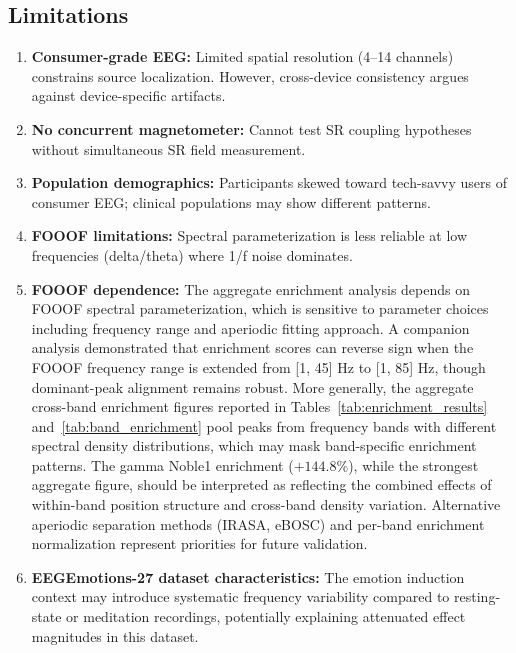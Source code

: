 \documentclass[11pt,a4paper]{article}
\begin{document}
\subsection{Limitations}

\begin{enumerate}
    \item \textbf{Consumer-grade EEG:} Limited spatial resolution (4--14 channels) constrains source localization. However, cross-device consistency argues against device-specific artifacts.

    \item \textbf{No concurrent magnetometer:} Cannot test SR coupling hypotheses without simultaneous SR field measurement.

    \item \textbf{Population demographics:} Participants skewed toward tech-savvy users of consumer EEG; clinical populations may show different patterns.

    \item \textbf{FOOOF limitations:} Spectral parameterization is less reliable at low frequencies (delta/theta) where 1/f noise dominates.

    \item \textbf{FOOOF dependence:} The aggregate enrichment analysis depends on FOOOF spectral parameterization, which is sensitive to parameter choices including frequency range and aperiodic fitting approach. A companion analysis \parencite{lacy2026lemon} demonstrated that enrichment scores can reverse sign when the FOOOF frequency range is extended from [1, 45] Hz to [1, 85] Hz, though dominant-peak alignment remains robust. More generally, the aggregate cross-band enrichment figures reported in Tables~\ref{tab:enrichment_results} and~\ref{tab:band_enrichment} pool peaks from frequency bands with different spectral density distributions, which may mask band-specific enrichment patterns. The gamma Noble1 enrichment ($+144.8\%$), while the strongest aggregate figure, should be interpreted as reflecting the combined effects of within-band position structure and cross-band density variation. Alternative aperiodic separation methods (IRASA, eBOSC) and per-band enrichment normalization represent priorities for future validation.

    \item \textbf{EEGEmotions-27 dataset characteristics:} The emotion induction context may introduce systematic frequency variability compared to resting-state or meditation recordings, potentially explaining attenuated effect magnitudes in this dataset.


\end{enumerate}
\end{document}
